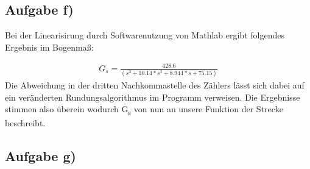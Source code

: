 \documentclass[10pt]{scrartcl}
\begin{document}
\subsection{Aufgabe f)}

Bei der Linearisirung durch Softwarenutzung von Mathlab ergibt folgendes Ergebnis im Bogenmaß:

\begin{align}
   G_s = \frac{428.6}{(s^3 + 10.14*s^2 + 8.944*s + 75.15)} 
\end{align}
Die Abweichung in der dritten Nachkommastelle des Zählers lässt sich dabei auf ein veränderten Rundungsalgorithmus im Programm verweisen. 
Die Ergebnisse stimmen also überein wodurch G\textsubscript{s} von nun an unsere Funktion der Strecke beschreibt.

\subsection{Aufgabe g)}
\end{document}
